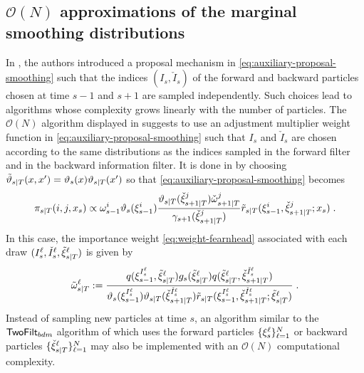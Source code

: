 \subsection{$\mathcal{O}(N)$ approximations of the marginal smoothing distributions}
In \cite{fearnhead:wyncoll:tawn:2010}, the authors introduced a proposal mechanism in \eqref{eq:auxiliary-proposal-smoothing} such that the indices $(I_{s},\check{I}_{s})$ of the forward and backward particles chosen at time $s-1$ and $s+1$ are sampled independently.  Such choices lead to algorithms whose complexity grows linearly with the number of particles. The $\mathcal{O}(N)$ algorithm displayed in  \cite{fearnhead:wyncoll:tawn:2010} suggests to use an adjustment multiplier weight function in \eqref{eq:auxiliary-proposal-smoothing} such that $I_{s}$ and $\check{I}_{s}$ are chosen according to the same distributions as the indices sampled in the forward filter and in the backward information filter. It is done in \cite{fearnhead:wyncoll:tawn:2010} by choosing $\adjfunc[smooth]{s}{T}{x,x'} = \adjfuncforward{s}(x)\adjfunc{s}{T}{x'}$ so that \eqref{eq:auxiliary-proposal-smoothing} becomes
\begin{equation}
\label{eq:inst-fearnhead:linear}
\instrpostaux{s}{T}(i,j,x_s) \propto  \ewght{s-1}{i}\adjfuncforward{s}(\epart{s-1}{i}) \frac{\adjfunc{s}{T}{\ebackpart{s+1}{T}{j}} \ebackwght{s+1}{T}{j}}{\gamma_{s+1}(\ebackpart{s+1}{T}{j})} \kiss[smooth]{s}{T}(\epart{s-1}{i},\ebackpart{s+1}{T}{j}; x_s)\eqsp.
\end{equation}
In this case, the importance weight \eqref{eq:weight-fearnhead} associated with each draw $(I_{s}^\ell,\check{I}_{s}^\ell, \tilde{\xi}_{s|T}^{\ell})$ is given by
\begin{equation}
\label{eq:weight-fearnhead:linear}
\smwght{s}{T}{\ell} \eqdef \frac{q(\epart{s-1}{I_{s}^\ell},\smpart{s}{T}{\ell}) g_s(\smpart{s}{T}{\ell}) q(\smpart{s}{T}{\ell},\ebackpart{s+1}{T}{\check{I}_{s}^\ell})}{\adjfuncforward{s}(\epart{s-1}{I_{s}^\ell})\adjfunc{s}{T}{\ebackpart{s+1}{T}{\check{I}_{s}^\ell}}
\kiss[smooth]{s}{T}(\epart{s-1}{I_{s}^\ell},\ebackpart{s+1}{T}{\check{I}_{s}^\ell}; \smpart{s}{T}{\ell}) } \eqsp.
\end{equation}
Instead of sampling new particles at time $s$,  an algorithm similar to the $\mathsf{TwoFilt}_{bdm}$ algorithm of  \cite{briers:doucet:maskell:2010} which uses  the forward particles $\{\xi_{s}^{\ell}\}_{\ell=1}^N$ or backward particles $\{{\check{\xi}}_{s|T}^{\ell}\}_{\ell=1}^N$ may also be implemented with an $\mathcal{O}(N)$ computational complexity. 
